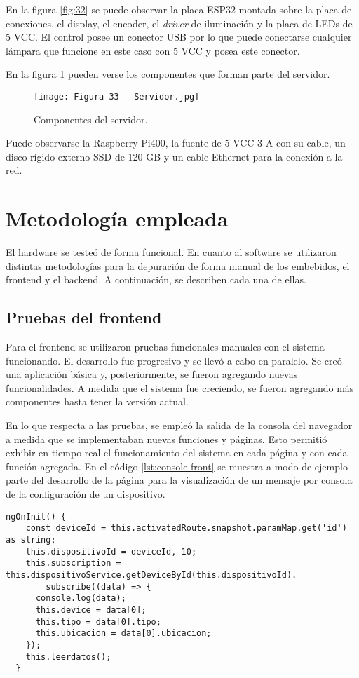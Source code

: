 En la figura  \ref{fig:32} se puede observar la placa ESP32 montada sobre la placa de conexiones, el display, el encoder, el \textit{driver} de iluminación y la placa de LEDs de 5 VCC. El control posee un conector USB por lo que puede conectarse cualquier lámpara que funcione en este caso con 5 VCC y posea este conector.

En la figura \ref{fig:33} pueden verse los componentes que forman parte del servidor.

\begin{figure}[h]
\centering
\texttt{[image: Figura 33 - Servidor.jpg]}
\caption[Componentes del servidor]{Componentes del servidor.}
\label{fig:33}
\end{figure}

Puede observarse la Raspberry Pi400, la fuente de 5 VCC 3 A con su cable, un disco rígido externo SSD de 120 GB y un cable Ethernet para la conexión a la red.

\section{Metodología empleada}

El hardware se testeó de forma funcional. En cuanto al software se utilizaron distintas metodologías para la depuración de forma manual de los embebidos, el frontend y el backend. A continuación, se describen cada una de ellas.

\subsection{Pruebas del frontend}

Para el frontend se utilizaron pruebas funcionales manuales con el sistema funcionando. El desarrollo fue progresivo y se llevó a cabo en paralelo. Se creó una aplicación básica y, posteriormente, se fueron agregando nuevas funcionalidades. A medida que el sistema fue creciendo, se fueron agregando más componentes hasta tener la versión actual.

En lo que respecta a las pruebas, se empleó la salida de la consola del navegador a medida que se implementaban nuevas funciones y páginas. Esto permitió exhibir en tiempo real el funcionamiento del sistema en cada página y con cada función agregada. En el código \ref{lst:console front} se muestra a modo de ejemplo parte del desarrollo de la página para la visualización de un mensaje por consola de la configuración de un dispositivo.

\begin{lstlisting}[caption={Muestra por consola de los datos recibidos.}, label={lst:console front}]
ngOnInit() {
    const deviceId = this.activatedRoute.snapshot.paramMap.get('id') as string;
    this.dispositivoId = deviceId, 10;
    this.subscription = this.dispositivoService.getDeviceById(this.dispositivoId).
   		subscribe((data) => {
      console.log(data);
      this.device = data[0];
      this.tipo = data[0].tipo;
      this.ubicacion = data[0].ubicacion;
    });
    this.leerdatos();
  }
\end{lstlisting}

